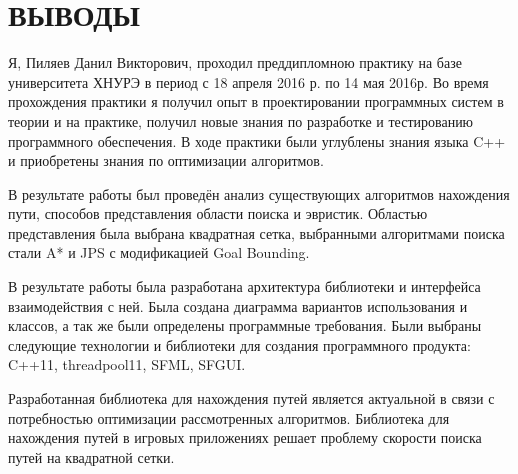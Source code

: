 \section*{ВЫВОДЫ}

\vspace{1\baselineskip} 

Я, Пиляев Данил Викторович, проходил преддипломною практику на базе университета ХНУРЭ  в период с 18 апреля 2016 р. по 14 мая 2016р. Во время прохождения практики я получил опыт в проектировании программных систем в теории и на практике, получил новые знания по разработке и тестированию программного обеспечения. В ходе практики были углублены знания языка C++ и приобретены знания по оптимизации алгоритмов.

В результате работы был проведён анализ существующих алгоритмов нахождения пути, способов представления области поиска и эвристик. Областью представления была выбрана квадратная сетка, выбранными алгоритмами поиска стали A* и JPS с модификацией Goal Bounding.

В результате работы была разработана архитектура библиотеки и интерфейса взаимодействия с ней. Была создана диаграмма вариантов использования и классов, а так же были определены программные требования. Были выбраны следующие технологии и библиотеки для создания программного продукта: C++11, threadpool11, SFML, SFGUI.

Разработанная библиотека для нахождения путей является актуальной в связи с потребностью оптимизации рассмотренных алгоритмов. Библиотека для нахождения путей в игровых приложениях решает проблему скорости поиска путей на квадратной сетки.